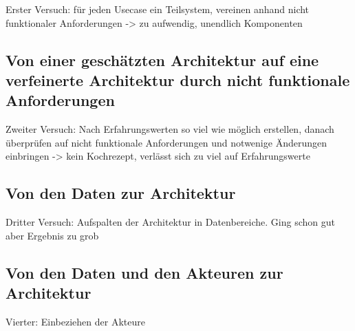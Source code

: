 Erster Versuch: für jeden Usecase ein Teilsystem, vereinen anhand nicht funktionaler Anforderungen -> zu aufwendig, unendlich Komponenten
\subsection{Von einer geschätzten Architektur auf eine verfeinerte Architektur durch nicht funktionale Anforderungen}
Zweiter Versuch: Nach Erfahrungswerten so viel wie möglich erstellen, danach überprüfen auf nicht funktionale Anforderungen und notwenige Änderungen einbringen -> kein Kochrezept, verlässt sich zu viel auf Erfahrungswerte
\subsection{Von den Daten zur Architektur}
Dritter Versuch: Aufspalten der Architektur in Datenbereiche. Ging schon gut aber Ergebnis zu grob
\subsection{Von den Daten und den Akteuren zur Architektur}
Vierter: Einbeziehen der Akteure
